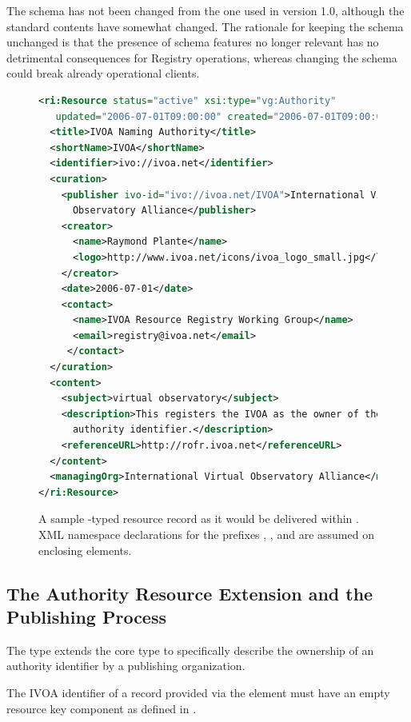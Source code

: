 \documentclass{ivoa}
\begin{document}
The schema has not been changed from the one used in version 1.0,
although the standard contents have somewhat changed.  The rationale for
keeping the schema unchanged is that the presence of schema features no longer relevant
has no detrimental consequences for Registry operations, whereas changing
the schema could break already operational clients.


\begin{figure}[th]
\begin{lstlisting}[language=XML]
<ri:Resource status="active" xsi:type="vg:Authority" 
   updated="2006-07-01T09:00:00" created="2006-07-01T09:00:00">
  <title>IVOA Naming Authority</title>
  <shortName>IVOA</shortName>
  <identifier>ivo://ivoa.net</identifier>
  <curation>
    <publisher ivo-id="ivo://ivoa.net/IVOA">International Virtual 
      Observatory Alliance</publisher>
    <creator>
      <name>Raymond Plante</name>
      <logo>http://www.ivoa.net/icons/ivoa_logo_small.jpg</logo>
    </creator>
    <date>2006-07-01</date>
    <contact>
      <name>IVOA Resource Registry Working Group</name>
      <email>registry@ivoa.net</email>
     </contact>
  </curation>
  <content>
    <subject>virtual observatory</subject>
    <description>This registers the IVOA as the owner of the ivoa.net
      authority identifier.</description>
    <referenceURL>http://rofr.ivoa.net</referenceURL>
  </content>
  <managingOrg>International Virtual Observatory Alliance</managingOrg>
</ri:Resource>
\end{lstlisting}

\caption{A sample -typed resource record as it would
be delivered within .  XML namespace declarations 
for the prefixes , , and  are
assumed on enclosing elements.}
\label{fig:authrecord}
\end{figure}

\subsection{The Authority Resource Extension and the Publishing Process}

\label{sect:authres}


The  type extends the core 
type to specifically describe the ownership of an authority identifier
by a publishing organization.

The IVOA identifier of a  record provided via the
 element must have an empty resource key component
as defined in \citet{std:VOID}.
\end{document}
